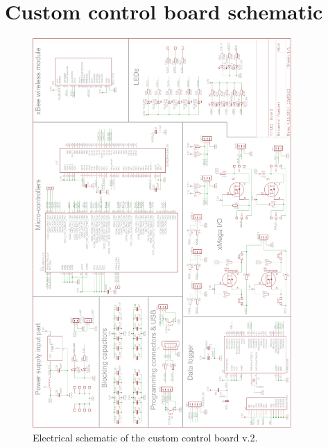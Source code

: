 \appendices
{} 

\cleardoublepage


\clearpage

\section{Custom control board schematic}\label{ape:schematic}
\begin{figure}[H]
\centering
\includegraphics[width=0.88\textwidth]{fig/schema.png}
\caption*{Electrical schematic of the custom control board v.2.}
\end{figure}

\cleardoublepage

